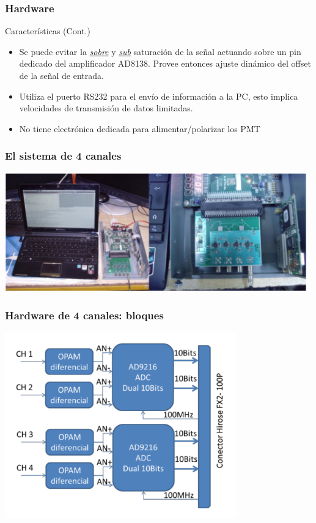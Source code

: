 \documentclass{beamer}
\begin{document}
\begin{frame}
	\frametitle{Hardware}
		\begin{exampleblock}{Características (Cont.)}
			\begin{itemize}
				\item Se puede evitar la \underline{\textit{sobre}} y
							\underline{\textit{sub}} saturación de la señal actuando
							sobre un pin dedicado del amplificador AD8138. Provee entonces
							\alert{ajuste dinámico del offset} de la señal de entrada.
				\item Utiliza el puerto RS232 para el envío de información a la PC, esto
							implica velocidades de transmisión de datos limitadas.
				\item No tiene electrónica dedicada para alimentar/polarizar los PMT
			\end{itemize}
		\end{exampleblock}
\end{frame}

\begin{frame}
  \frametitle{El sistema de 4 canales}
  \begin{block}{}
    \begin{center}
    \includegraphics[height=0.55\textheight,width=0.98\textwidth]{d5/vista_sistema_lago_mx}
		\end{center}
  \end{block}
\end{frame}

\begin{frame}
  \frametitle{Hardware de 4 canales: bloques}
  \begin{block}{}
    \begin{center}
    \includegraphics[height=0.75\textheight,width=0.75\textwidth]{d5/bloques_lago_mx}
		\end{center}
  \end{block}
\end{frame}
\end{document}
